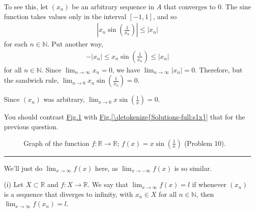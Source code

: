 \documentclass[letterpaper,10pt,english]{jupyterBook}
\let\sphinxpxdimen\pdfpxdimen\else\newdimen\sphinxpxdimen
\begin{document}
To see this, let \((x_{n})\) be an arbitrary sequence in \(A\) that converges to \(0\). The sine function takes values only in the interval \([-1,1]\), and so
\begin{equation*}
\begin{split}
\left|x_n\sin\left(\frac{1}{x_n}\right)\right| \leq |x_n|
\end{split}
\end{equation*}
\sphinxAtStartPar
for each \(n\in\mathbb{N}\). Put another way,
\begin{equation*}
\begin{split}
-|x_{n}| \leq x_{n}\sin\left(\frac{1}{x_n}\right) \leq |x_{n}|
\end{split}
\end{equation*}
\sphinxAtStartPar
for all \(n\in\mathbb{N}\). Since \(\displaystyle\lim_{n\to \infty} x_n=0\), we have \( \displaystyle\lim_{n\to \infty} |x_n| =0\). Therefore, but the sandwich rule, \(\displaystyle\lim_{n\rightarrow 0}x_n\sin\left(\frac{1}{x_n}\right) = 0\).

Since \((x_n)\) was arbitrary, \(\displaystyle\lim_{x \rightarrow 0} x \sin\left(\frac{1}{x}\right) = 0\).

You should contrast \hyperref[\detokenize{Solutions-full:xs1x}]{Fig.\@ \ref{\detokenize{Solutions-full:xs1x}}} with \hyperref[\detokenize{Solutions-full:s1x}]{Fig.\@ \ref{\detokenize{Solutions-full:s1x}}} that for the previous question.

\begin{figure}[htbp]
\centering
\capstart

\noindent\sphinxincludegraphics[width=700\sphinxpxdimen]{{xsin(1,x)}.png}
\caption{Graph of the function \(f:\mathbb{R}\to\mathbb{R}\); \(f(x)=x\sin\left(\frac{1}{x}\right)\) (Problem 10).}\label{\detokenize{Solutions-full:xs1x}}\end{figure}


\bigskip\hrule\bigskip


\sphinxAtStartPar
{\hyperref[\detokenize{Problems:id11}]{}} We’ll just do \(\displaystyle\lim_{x \rightarrow \infty}f(x)\) here, as \(\displaystyle\lim_{x \rightarrow -\infty}f(x)\) is so similar.

\sphinxAtStartPar
(i) Let \(X\subset\mathbb{R}\) and \(f:X\to\mathbb{R}\). We say that \(\lim_{x \rightarrow \infty}f(x) = l\) if whenever \((x_{n})\) is a sequence that diverges to infinity, with \(x_{n}\in X\) for all \(n\in\mathbb{N}\), then \(\lim_{x \rightarrow \infty}f(x_{n}) = l\).
\end{document}
